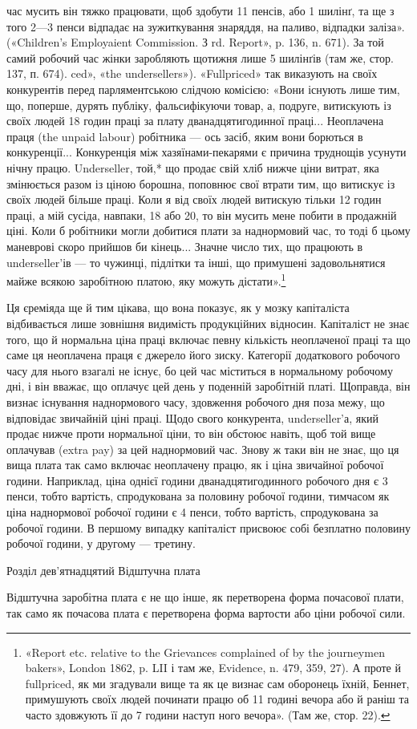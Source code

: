 час мусить він тяжко працювати, щоб здобути 11 пенсів, або 1 шилінґ,
та ще з того 2—3 пенси відпадає на зужиткування знаряддя, на паливо,
відпадки заліза». («Children’s Employaient Commission. З rd. Report», p.
136, n. 671). За той самий робочий час жінки заробляють щотижня
лише 5 шилінґів (там же, стор. 137, п. 674).
ced», «the undersellers»). «Fullpriced» так виказують на своїх
конкурентів перед парляментською слідчою комісією: «Вони
існують лише тим, що, поперше, дурять публіку, фальсифікуючи
товар, а, подруге, витискують із своїх людей 18 годин праці
за плату дванадцятигодинної праці... Неоплачена праця (the
unpaid labour) робітника — ось засіб, яким вони борються в
конкуренції... Конкуренція між хазяїнами-пекарями є причина
труднощів усунути нічну працю. Underseller, той,* що продає
свій хліб нижче ціни витрат, яка змінюється разом із ціною
борошна, поповнює свої втрати тим, що витискує із своїх людей
більше праці. Коли я від своїх людей витискую тільки 12 годин
праці, а мій сусіда, навпаки, 18 або 20, то він мусить мене побити
в продажній ціні. Коли б робітники могли добитися плати за
наднормовий час, то тоді б цьому маневрові скоро прийшов би
кінець... Значне число тих, що працюють в underseller’ів — то
чужинці, підлітки та інші, що примушені задовольнятися майже
всякою заробітною платою, яку можуть дістати».\footnote{
«Report etc. relative to the Grievances complained of by the
journeymen bakers», London 1862, p. LII і там же, Evidence, n. 479,
359, 27). А проте й fullpriced, як ми згадували вище та як це визнає сам
оборонець їхній, Беннет, примушують своїх людей починати працю об
11 годині вечора або й раніш та часто здовжують її до 7 години наступ
ного вечора». (Там же, стор. 22).
}

Ця єреміяда ще й тим цікава, що вона показує, як у мозку
капіталіста відбивається лише зовнішня видимість продукційних
відносин. Капіталіст не знає того, що й нормальна ціна праці
включає певну кількість неоплаченої праці та що саме ця неоплачена
праця є джерело його зиску. Категорії додаткового робочого
часу для нього взагалі не існує, бо цей час міститься в нормальному
робочому дні, і він вважає, що оплачує цей день у поденній
заробітній платі. Щоправда, він визнає існування наднормового
часу, здовження робочого дня поза межу, що відповідає звичайній
ціні праці. Щодо свого конкурента, underseller’а, який продає
нижче проти нормальної ціни, то він обстоює навіть, щоб той
вище оплачував (extra pay) за цей наднормовий час. Знову ж
таки він не знає, що ця вища плата так само включає неоплачену
працю, як і ціна звичайної робочої години. Наприклад,
ціна однієї години дванадцятигодинного робочого дня є 3 пенси,
тобто вартість, спродукована за половину робочої години, тимчасом
як ціна наднормової робочої години є 4 пенси, тобто вартість,
спродукована за  робочої години. В першому випадку капіталіст
присвоює собі безплатно половину робочої години, у
другому — третину.

Розділ дев’ятнадцятий
Відштучна плата

Відштучна заробітна плата є не що інше, як перетворена
форма почасової плати, так само як почасова плата є перетворена
форма вартости або ціни робочої сили.
